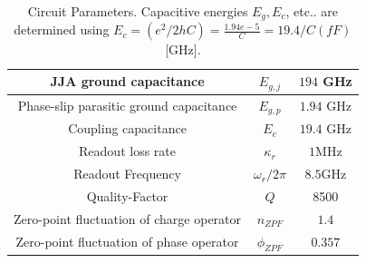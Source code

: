 \documentclass[%
reprint,
superscriptaddress,
 amsmath,amssymb,
 aps,
 prx,
longbibliography,
floatfix,
]{revtex4-2}
\begin{document}
\begin{table}[htb]
\begin{center}
\begin{tabular}{|c |c |c|}
\hline
JJA ground capacitance&$E_{g,j}$&$194$ GHz\\ 
\hline
Phase-slip parasitic ground capacitance&$E_{g,p}$&$1.94$ GHz\\ 
\hline
Coupling capacitance&$E_{c}$ &$19.4$ GHz\\ 
\hline
Readout loss rate&$\kappa_r$&$1$MHz\\
\hline
Readout Frequency &$\omega_r/2\pi$&$8.5$GHz\\
\hline
Quality-Factor& $Q$&8500\\
 \hline
  Zero-point fluctuation of charge operator&$n_{ZPF}$&$1.4$\\
 \hline
Zero-point fluctuation of phase operator &$\phi_{ZPF}$&$0.357$\\
 \hline
\end{tabular}
\end{center}

\caption{Circuit Parameters. Capacitive energies $E_g, E_c$, etc.. are determined using $E_c=(e^2/2hC)=\frac{1.94 e-5}{C}=19.4/C(fF) $[GHz].}
\label{tab:params}
\end{table}
\end{document}
